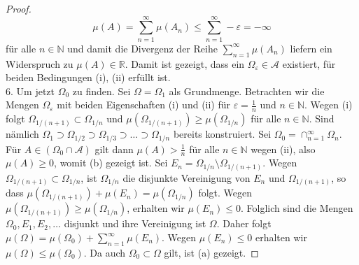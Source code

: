 \documentclass[/Users/zhangwusheng/Documents/satz von radon nikodym/satz von radon nikodym.tex]{subfiles}
\begin{document}
\begin{proof}
        \[\mu(A)= \sum_{n=1}^\infty \mu(A_n) \leq \sum_{n=1}^\infty -\varepsilon = -\infty\]
        für alle $n \in \mathbb{N}$ und damit die Divergenz der Reihe $\sum_{n=1}^\infty \mu(A_n)$ liefern ein Widerspruch zu $\mu(A) \in \mathbb{R}$. 
        Damit ist gezeigt, dass ein $\Omega_{\varepsilon} \in \mathcal{A}$ existiert, für beiden Bedingungen (i), (ii) erfüllt ist.\\
        6. Um jetzt $\Omega_0$ zu finden. Sei $\Omega = \Omega_1$ als Grundmenge. Betrachten wir die Mengen $\Omega_{\varepsilon}$ mit beiden Eigenschaften (i) und (ii) für $\varepsilon = \frac{1}{n}$ und $n \in \mathbb{N}$.
        Wegen (i) folgt $\Omega_{1/(n+1)} \subset \Omega_{1/n}$ und $\mu(\Omega_{1/(n+1)}) \geq \mu(\Omega_{1/n})$ für alle $n \in \mathbb{N}$. Sind nämlich $\Omega_1 \supset \Omega_{1/2} \supset \Omega_{1/3} \supset
        \ldots \supset \Omega_{1/n}$ bereits konstruiert. Sei $\Omega_0 = \cap_{n=1}^\infty \Omega_n$. Für $A \in (\Omega_0 \cap \mathcal{A})$ gilt dann $\mu(A) > \frac{1}{n}$ für alle $n \in \mathbb{N}$ wegen (ii), also $\mu(A) \geq 0$, womit (b) gezeigt ist.
        Sei $E_{n} =\Omega_{1/n} \setminus \Omega_{1/(n+1)}$. Wegen $\Omega_{1/(n+1)} \subset \Omega_{1/n}$, ist $\Omega_{1/n}$ die disjunkte Vereinigung von $E_n$ und $\Omega_{1/(n+1)}$, so dass $\mu(\Omega_{1/(n+1)}) + \mu(E_n) = \mu(\Omega_{1/n})$ folgt. 
        Wegen $\mu(\Omega_{1/(n+1)}) \geq \mu(\Omega_{1/n})$, erhalten wir $\mu(E_n) \leq 0$. Folglich sind die Mengen $\Omega_{0}, E_1, E_2, \ldots$ disjunkt und ihre Vereinigung ist $\Omega$. Daher folgt $\mu(\Omega) = \mu(\Omega_0) + \sum_{n=1}^\infty \mu(E_n)$. 
        Wegen $\mu(E_n) \leq 0$ erhalten wir $\mu(\Omega) \leq \mu(\Omega_0)$. Da auch $\Omega_0 \subset \Omega$ gilt, ist (a) gezeigt. 
    \end{proof}
\end{document}
